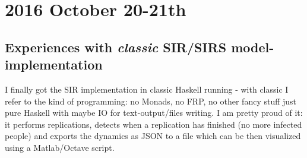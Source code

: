 \section*{2016 October 20-21th}
\subsection*{Experiences with \textit{classic} SIR/SIRS model-implementation}
I finally got the SIR implementation in classic Haskell running - with classic I refer to the kind of programming: no Monads, no FRP, no other fancy stuff just pure Haskell with maybe IO for text-output/files writing. I am pretty proud of it: it performs replications, detects when a replication has finished (no more infected people) and exports the dynamics as JSON to a file which can be then visualized using a Matlab/Octave script.

